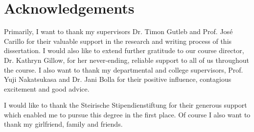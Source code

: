 \chapter*{Acknowledgements}

Primarily, I want to thank my supervisors Dr. Timon Gutleb and Prof. José Carillo for their valuable support in the research and writing process of this dissertation.
I would also like to extend further gratitude to our course director, Dr. Kathryn Gillow, for her never-ending, reliable support to all of us throughout the course.
I also want to thank my departmental and college supervisors, Prof. Yuji Nakatsukasa and Dr. Jani Bolla for their positive influence, contagious excitement and good advice.

I would like to thank the Steirische Stipendienstiftung for their generous support which enabled me to pursue this degree in the first place.
Of course I also want to thank my girlfriend, family and friends.


